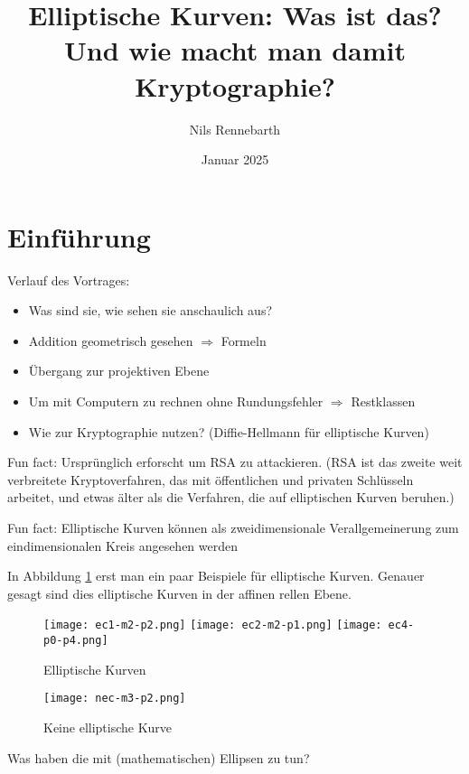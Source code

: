 \documentclass{article}
\title{Elliptische Kurven: Was ist das? \\
  Und wie macht man damit Kryptographie?}
\author{Nils Rennebarth}
\date{Januar 2025}
\begin{document}
\maketitle
\section{Einführung}
Verlauf des Vortrages:

\begin{itemize}
\item
  Was sind sie, wie sehen sie anschaulich aus?
\item
  Addition geometrisch gesehen $\Rightarrow$ Formeln
\item
  Übergang zur projektiven Ebene
\item
  Um mit Computern zu rechnen ohne Rundungsfehler $\Rightarrow$ Restklassen
\item
  Wie zur Kryptographie nutzen? (Diffie-Hellmann für elliptische Kurven)
\end{itemize}

Fun fact: Ursprünglich erforscht um RSA zu attackieren. (RSA ist das
zweite weit verbreitete Kryptoverfahren, das mit öffentlichen und
privaten Schlüsseln arbeitet, und etwas älter als die Verfahren, die
auf elliptischen Kurven beruhen.)

Fun fact: Elliptische Kurven können als zweidimensionale
Verallgemeinerung zum eindimensionalen Kreis angesehen werden

In Abbildung \ref{fig:ecurves} erst man ein paar Beispiele für elliptische Kurven.
Genauer gesagt sind dies elliptische Kurven in der affinen rellen Ebene.


\begin{figure}[h]
  \texttt{[image: ec1-m2-p2.png]}
  \texttt{[image: ec2-m2-p1.png]}
  \texttt{[image: ec4-p0-p4.png]}
  
  \caption{Elliptische Kurven}
  \label{fig:ecurves}
\end{figure}

\begin{figure}
  \centering
    \texttt{[image: nec-m3-p2.png]}
  \caption{Keine elliptische Kurve}
  \label{fig:noecurve}
\end{figure}

Was haben die mit (mathematischen) Ellipsen zu tun?
\end{document}
